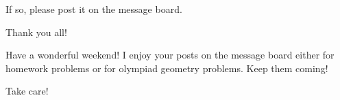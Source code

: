 If so, please post it on the message board.

Thank you all!

Have a wonderful weekend! I enjoy your posts on the message board either for homework problems or for olympiad geometry problems. Keep them coming!

Take care! 




















